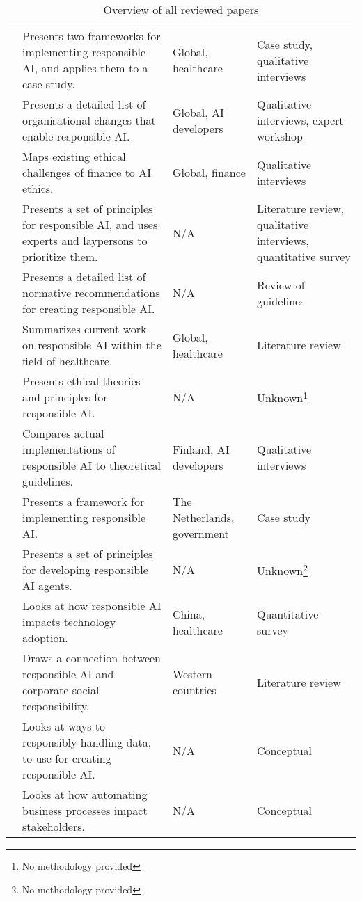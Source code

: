 \begin{table}[!ht]
\begin{tabular}{lp{}lp{}}
        \textcite{Peters_2020} & Presents two frameworks for implementing responsible AI, and applies them to a case study. & Global, healthcare & Case study, qualitative interviews \\ 
        \textcite{Rakova_2021} & Presents a detailed list of organisational changes that enable responsible AI. & Global, AI developers & Qualitative interviews, expert workshop \\ 
        \textcite{Rizinski_2022} & Maps existing ethical challenges of finance to AI ethics. & Global, finance & Qualitative interviews \\ 
        \textcite{Rothenberger_2019} & Presents a set of principles for responsible AI, and uses experts and laypersons to prioritize them. & N/A & Literature review, qualitative interviews, quantitative survey \\ 
        \textcite{Ryan_2020} & Presents a detailed list of normative recommendations for creating responsible AI. & N/A & Review of guidelines \\ 
        \textcite{Siala_2022} & Summarizes current work on responsible AI within the field of healthcare. & Global, healthcare & Literature review \\ 
        \textcite{Thelisson_2018} & Presents ethical theories and principles for responsible AI. & N/A & Unknown\footnote{No methodology provided} \\ 
        \textcite{Vakkuri_2022} & Compares actual implementations of responsible AI to theoretical guidelines. & Finland, AI developers & Qualitative interviews \\ 
        \textcite{van_2021} & Presents a framework for implementing responsible AI. & The Netherlands, government & Case study \\ 
        \textcite{Vetrò_2019} & Presents a set of principles for developing responsible AI agents. & N/A & Unknown\footnote{No methodology provided} \\ 
        \textcite{Wang_2021} & Looks at how responsible AI impacts technology adoption. & China, healthcare & Quantitative survey \\ 
        \textcite{Wang_2020} & Draws a connection between responsible AI and corporate social responsibility. & Western countries & Literature review \\ 
        \textcite{Werder_2022} & Looks at ways to responsibly handling data, to use for creating responsible AI. & N/A & Conceptual \\ 
        \textcite{Wright_2018} & Looks at how automating business processes impact stakeholders. & N/A & Conceptual \\ 
    \bottomrule
    \end{tabular}
    \caption{Overview of all reviewed papers}
    \label{tab:paper-overview}
\end{table}